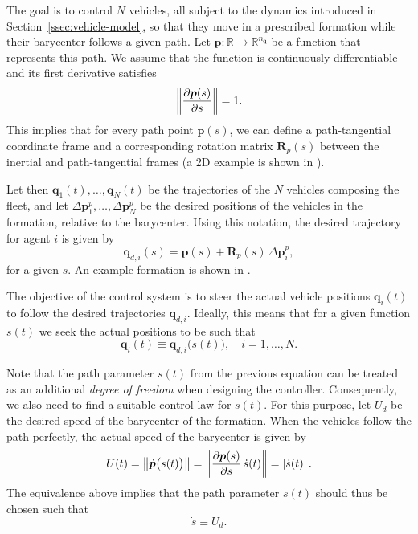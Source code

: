 The goal is to control $N$ vehicles, all subject to the dynamics introduced in Section~\ref{ssec:vehicle-model}, so that they move in a prescribed formation while their barycenter follows a given path.
Let $\bm{p} : \mathbb{R} \rightarrow \mathbb{R}^{n_{\bm{q}}}$ be a function that represents this path. We assume that the function is continuously differentiable and its first derivative satisfies
\begin{equation}
    \left\|\frac{\partial \bm{p}(s)}{\partial s}\right\| = 1.
    \label{eq:path_assumption}
\end{equation}
This implies that for every path point $\bm{p}(s)$, we can define a path-tangential coordinate frame and a corresponding rotation matrix $\bm{R}_p(s)$ between the inertial and path-tangential frames (a 2D example is shown in ).

Let then $\bm{q}_1(t), \ldots, \bm{q}_N(t)$ be the trajectories of the $N$ vehicles composing the fleet, and let $\Delta \bm{p}_1^p, \ldots, \Delta \bm{p}_N^p$ be the desired  positions of the vehicles in the formation, relative to the barycenter. Using this notation, the desired trajectory for agent $i$ is given by
\begin{equation}
    \bm{q}_{d,i}(s) = \bm{p}(s) + \bm{R}_p(s)\, \Delta \bm{p}_i^p,
\end{equation} 
for a given $s$.
An example formation is shown in .

The objective of the control system is to steer the actual vehicle positions $\bm{q}_i(t)$ to follow the desired trajectories $\bm{q}_{d,i}$. Ideally, this means that for a given function $s(t)$ we seek the actual positions to be such that
\begin{equation}
    \bm{q}_i(t)
    \equiv
    \bm{q}_{d,i}\big(s(t)\big),
    \quad i = 1, \ldots, N.
    \label{eq:path_goal}
\end{equation} 

Note that the path parameter $s(t)$ from the previous equation can be treated as an additional \emph{degree of freedom} when designing the controller. Consequently, we also need to find a suitable control law for $s(t)$. For this purpose, let $U_d$ be the desired speed of the barycenter of the formation. %
When the vehicles follow the path perfectly, the actual speed of the barycenter is given by
\begin{equation}
    U(t)
    =
    \left\|\dot{\bm{p}} \big( s(t) \big)\right\|
    =
    \left\|\frac{\partial \bm{p}(s)}{\partial s}\,\dot{s}(t) \right\| = \left|\dot{s}(t)\right|.
\end{equation}
The equivalence above implies that the path parameter $s(t)$ should thus be chosen such that
\begin{equation}
    \dot{s} \equiv U_d.
    \label{eq:param_goal}
\end{equation}



